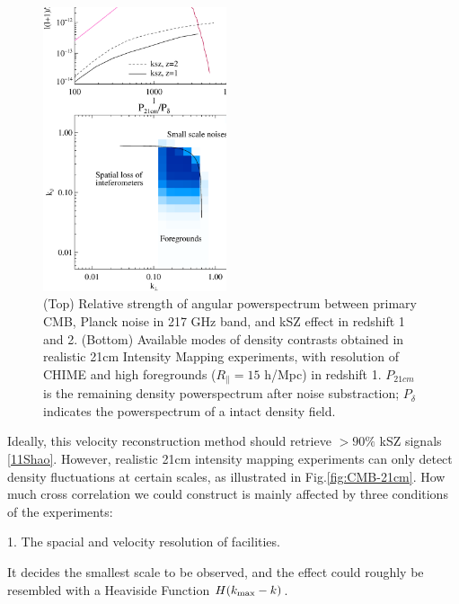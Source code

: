 \begin{figure}[tbp]
\begin{center}
\includegraphics[width=0.48\textwidth]{figure/cmb_21cm.eps}
\end{center}
\vspace{-0.7cm}
\caption{
    (Top) Relative strength of angular powerspectrum between primary CMB, Planck noise in 217 GHz band, and kSZ effect in redshift 1 and 2.
    (Bottom) Available modes of density contrasts obtained 
    in realistic 21cm Intensity Mapping experiments, 
    with resolution of CHIME and high foregrounds ($R_\parallel=15$ h/Mpc) 
    in redshift 1. 
    $P_{21cm}$ is the remaining density powerspectrum after noise substraction; 
    $P_\delta$ indicates the powerspectrum of a intact density field.
}
\label{fig:cmb_21cm}
\end{figure}

Ideally, this velocity reconstruction method should 
retrieve $>90\%$ kSZ signals \ref{11Shao}. 
However, realistic 21cm intensity mapping experiments 
can only detect density fluctuations at certain scales, 
as illustrated in Fig.\ref{fig:CMB-21cm}. 
How much cross correlation we could construct is mainly affected 
by three conditions of the experiments:

1. The spacial and velocity resolution of facilities. 

It decides the smallest scale to be observed, 
and the effect could roughly be resembled with a Heaviside Function 
$H(k_\mathrm{max}-k)$. 

